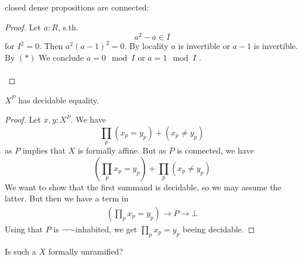 \begin{lemma}
	closed dense propositions are connected:
	
\end{lemma}
\begin{proof}
	Let $a : R$, s.th. 
	\[a^2 - a \in I \tag{$\star$}\]
	for $I^2 = 0$. Then $a^2 (a-1)^2 =0$. By locality $a$ is invertible or $a-1$ is invertible. By $(*)$ We conclude $a = 0 \mod I$ or $a = 1 \mod I$ . \\\\
	
\end{proof}
\begin{lemma}
	$X^P$ has decidable equality.
\end{lemma}
\begin{proof}
	Let $x , y : X^P$. We have
	\[
	\prod_p (x_p = y_p) + (x_p \neq y_p)
	\]
	as $P$ implies that $X$ is formally \etale affine. But as $P$ is connected, we have
	\[
	(\prod_p x_p = y_p) + \prod_p (x_p \neq y_p)
	\]
	We want to show that the first summand is decidable, so we may assume the latter.
	But then we have a term in 
	\begin{align*}
		\left(\prod_p x_p = y_p \right) \to P \to \bot 
	\end{align*}
	Using that $P$ is $\lnot \lnot$-inhabited, we get $\prod_p x_p = y_p$ beeing decidable.
\end{proof}
\begin{question}
	Is such a $X$ formally unramified?
\end{question}
